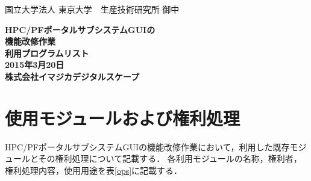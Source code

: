\documentclass[a4paper,10pt,oneside]{jsbook}
\begin{document}
\begin{titlepage}
\noindent
国立大学法人 東京大学　生産技術研究所 御中
\begin{center}
	\vspace{8cm}
	{\Huge \textbf{HPC/PFポータルサブシステムGUIの\\機能改修作業} } \\
	\vspace{1cm}
	{\Huge \textbf{利用プログラムリスト}} \\
	\vspace{10cm}
	{\Large \textbf{2015年3月20日}} \\
	\vspace{0.5cm}
	{\Large \textbf{株式会社イマジカデジタルスケープ}}
\end{center}
\end{titlepage}

\tableofcontents

\chapter{使用モジュールおよび権利処理}
HPC/PFポータルサブシステムGUIの機能改修作業において，利用した既存モジュールとその権利処理について記載する．
各利用モジュールの名称，権利者，権利処理内容，使用用途を表\ref{ops}に記載する．
\end{document}

